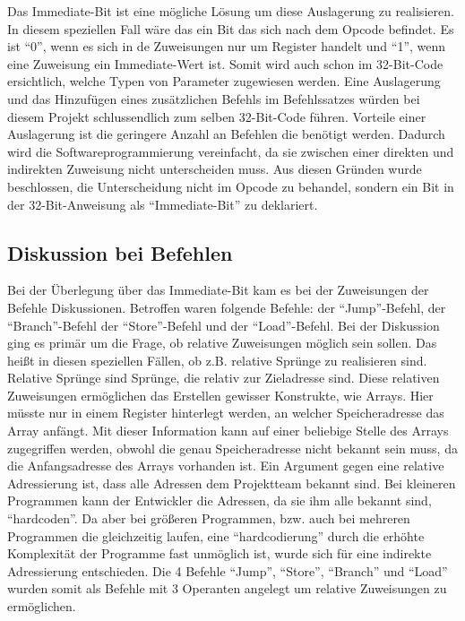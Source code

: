 \documentclass[paper=a4,fontsize=12pt,twocolumn]{scrreprt}
\begin{document}
Das Immediate-Bit ist eine mögliche Lösung um diese Auslagerung zu realisieren.
In diesem speziellen Fall wäre das ein Bit das sich nach dem Opcode befindet.
Es ist \enquote{0}, wenn es sich in de Zuweisungen nur um Register handelt und \enquote{1}, wenn eine Zuweisung ein Immediate-Wert ist.
Somit wird auch schon im 32-Bit-Code ersichtlich, welche Typen von Parameter zugewiesen werden.
Eine Auslagerung und das Hinzufügen eines zusätzlichen Befehls im Befehlssatzes würden bei diesem Projekt schlussendlich zum selben 32-Bit-Code führen.
Vorteile einer Auslagerung ist die geringere Anzahl an Befehlen die benötigt werden.
Dadurch wird die Softwareprogrammierung vereinfacht, da sie zwischen einer direkten und indirekten Zuweisung nicht unterscheiden muss.
Aus diesen Gründen wurde beschlossen, die Unterscheidung nicht im Opcode zu behandel, sondern ein Bit in der 32-Bit-Anweisung als \enquote{Immediate-Bit} zu deklariert.


\subsection{Diskussion bei Befehlen}

Bei der Überlegung über das Immediate-Bit kam es bei der Zuweisungen der Befehle Diskussionen.
Betroffen waren folgende Befehle: der \enquote{Jump}-Befehl, der \enquote{Branch}-Befehl der \enquote{Store}-Befehl und der \enquote{Load}-Befehl. 
Bei der Diskussion ging es primär um die Frage, ob relative Zuweisungen möglich sein sollen.
Das heißt in diesen speziellen Fällen, ob z.B. relative Sprünge zu realisieren sind.
Relative Sprünge sind Sprünge, die relativ zur Zieladresse sind.
Diese relativen Zuweisungen ermöglichen das Erstellen gewisser Konstrukte, wie Arrays.
Hier müsste nur in einem Register hinterlegt werden, an welcher Speicheradresse das Array anfängt.
Mit dieser Information kann auf einer beliebige Stelle des Arrays zugegriffen werden, obwohl die genau Speicheradresse nicht bekannt sein muss, da die Anfangsadresse des Arrays vorhanden ist.
Ein Argument gegen eine relative Adressierung ist, dass alle Adressen dem Projektteam bekannt sind.
Bei kleineren Programmen kann der Entwickler die Adressen, da sie ihm alle bekannt sind, \enquote{hardcoden}.
Da aber bei größeren Programmen, bzw. auch bei mehreren Programmen die gleichzeitig laufen, eine  \enquote{hardcodierung} durch die erhöhte Komplexität der Programme fast unmöglich ist, wurde sich für eine indirekte Adressierung entschieden.
Die 4 Befehle \enquote{Jump}, \enquote{Store}, \enquote{Branch} und \enquote{Load} wurden somit als Befehle mit 3 Operanten angelegt um relative Zuweisungen zu ermöglichen.
\end{document}
